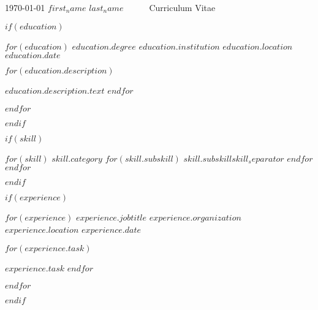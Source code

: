 \documentclass[11pt, a4paper]{awesome-cv}
\begin{document}
\makecvheader

\makecvfooter
  {\today}
  {$first_name$ $last_name$~~~\textperiodcentered~~~Curriculum Vitae}
  {\thepage}




$if(education)$

\begin{cventries}
  $for(education)$
  \cventry
  {$education.degree$} %
  {$education.institution$} %
  {$education.location$} %
  {$education.date$} %
  {
  \begin{cvitems}
    $for(education.description)$
    \item {$education.description.text$}
    $endfor$
  \end{cvitems}
  }
  $endfor$
\end{cventries}
$endif$


$if(skill)$

\begin{cvskills}
  $for(skill)$
  \cvskill
  {$skill.category$}
  {
  $for(skill.subskill)$
  $skill.subskill$$skill_separator$
  $endfor$
  }
  $endfor$
\end{cvskills}
$endif$


$if(experience)$

\begin{cventries}
  $for(experience)$
  \cventry
  {$experience.jobtitle$}
  {$experience.organization$}
  {$experience.location$}
  {$experience.date$}
  {
  \begin{cvitems}
    $for(experience.task)$
    \item {$experience.task$}
    $endfor$
  \end{cvitems}
  }
  $endfor$
\end{cventries}
$endif$
\end{document}
